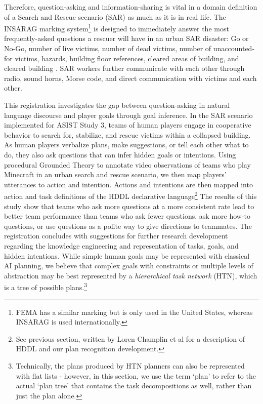 Therefore, question-asking and information-sharing is vital in a domain definition of a Search and Rescue scenario (SAR)  as much as it is in real life. The INSARAG marking system\footnote{FEMA has a similar marking but is only used in the United States, whereas INSARAG is used internationally.} is designed to immediately answer the most frequently-asked questions a rescuer will have in an urban SAR disaster: Go or No-Go, number of live victims, number of dead victims, number of unaccounted-for victims, hazards, building floor references, cleared areas of building, and cleared building \citet{insarag_2022}. SAR workers further communicate with each other through radio, sound horns, Morse code, and direct communication with victims and each other.

This registration investigates the gap between question-asking in natural language discourse and player goals through goal inference. In the SAR scenario implemented for ASIST Study 3, teams of human players engage in cooperative behavior to search for, stabilize, and rescue victims within a collapsed building. As human players verbalize plans, make suggestions, or tell each other what to do, they also ask questions that can infer hidden goals or intentions. Using procedural Grounded Theory to annotate video observations of teams who play Minecraft in an urban search and rescue scenario, we then map players' utterances to action and intention. Actions and intentions are then mapped into action and task definitions of the HDDL declarative language\footnote{See previous section, written by Loren Champlin et al for a description of HDDL and our plan recognition development.} The results of this study show that teams who ask more questions at a more consistent rate lead to better team performance than teams who ask fewer questions, ask more how-to questions, or use questions as a polite way to give directions to teammates. The registration concludes with suggestions for further research development regarding the knowledge engineering and representation of tasks, goals, and hidden intentions. While simple human goals may be represented with classical AI planning, we believe that complex goals with constraints or multiple levels of abstraction may be best represented by a \emph{hierarchical task network} (HTN), which is a tree of possible plans.\footnote{Technically, the plans produced by HTN planners can also be represented with flat lists - however, in this section, we use the term `plan' to refer to the actual `plan tree' that contains the task decompositions
as well, rather than just the plan alone.}

